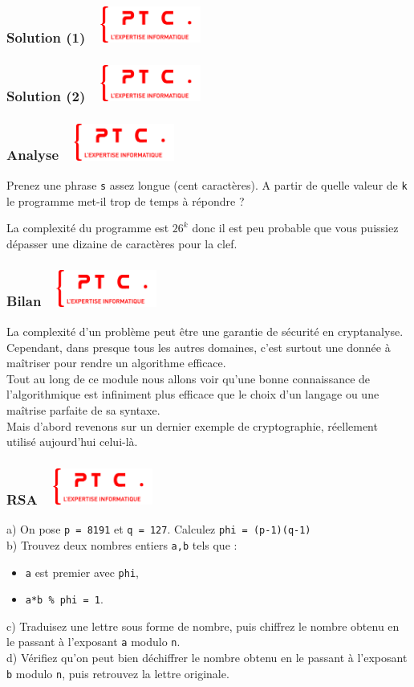 \documentclass[11pt]{beamer}
\newenvironment{slide}[1]{%
\begin{frame}[environment=slide]
\frametitle{#1~\hfill~\includegraphics[height=1.2cm]{./epitech.png}}
}{%
\end{frame}
}
\newcommand{\Python}[1]{
	{\small	}
}
\begin{document}
\begin{slide}{Solution (1)}
\Python{cipher2}
\end{slide}

\begin{slide}{Solution (2)}
\Python{break2}
\end{slide}

\begin{slide}{Analyse}
Prenez une phrase \texttt{s} assez longue (cent caractères). A partir de quelle valeur de \texttt{k} le programme met-il trop de temps à répondre ?\\
\vspace{0.2cm}
\pause

La complexité du programme est $26^k$ donc il est peu probable que vous puissiez dépasser une dizaine de caractères pour la clef.

\end{slide}

\begin{slide}{Bilan}

La complexité d'un problème peut être une garantie de sécurité en cryptanalyse. Cependant, dans presque tous les autres domaines, c'est surtout une donnée à maîtriser pour rendre un algorithme efficace.\\
\vspace{0.2cm}
Tout au long de ce module nous allons voir qu'une bonne connaissance de l'algorithmique est infiniment plus efficace que le choix d'un langage ou une maîtrise parfaite de sa syntaxe.\\
\vspace{0.2cm}
Mais d'abord revenons sur un dernier exemple de cryptographie, réellement utilisé aujourd'hui celui-là.

\end{slide}

\begin{slide}{RSA}
a) On pose \texttt{p = 8191} et \texttt{q = 127}. Calculez \texttt{phi = (p-1)(q-1)}\\

b) Trouvez deux nombres entiers \texttt{a,b} tels que :
\begin{itemize}
\item \texttt{a} est premier avec \texttt{phi},
\item \texttt{a*b \% phi = 1}.
\end{itemize}

c) Traduisez une lettre sous forme de nombre, puis chiffrez le nombre obtenu en le passant à l'exposant \texttt{a} modulo \texttt{n}. \\

d) Vérifiez qu'on peut bien déchiffrer le nombre obtenu en le passant à l'exposant \texttt{b} modulo \texttt{n}, puis retrouvez la lettre originale.\\
\end{slide}
\end{document}
